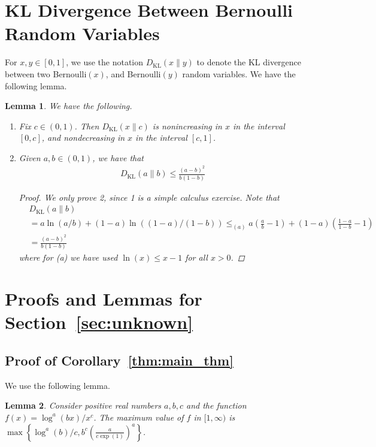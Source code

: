 \documentclass[12pt,draftcls, onecolumn]{IEEEtran}
\newtheorem{lemma}{Lemma}
\begin{document}
\section{KL Divergence Between Bernoulli Random Variables}
For $x,y \in [0,1]$, we use the notation $D_{\text{KL}}(x\lVert y)$ to denote the KL divergence between two Bernoulli$(x)$, and Bernoulli$(y)$ random variables. We have the following lemma.
\begin{lemma}\label{lemma:bern_KL}
     We have the following.
     \begin{enumerate}
         \item Fix $c \in (0,1)$. Then $D_{\text{KL}}(x\lVert c)$ is nonincreasing in $x$ in the interval $[0,c]$, and nondecreasing in $x$ in the interval $[c,1]$.
         \item Given $a,b \in (0,1)$, we have that
        \begin{align}
            D_{\text{KL}}(a\lVert b) \leq \frac{(a-b)^2}{b(1-b)} \nonumber
        \end{align}
        \begin{proof}
            We only prove 2, since 1 is a simple calculus exercise. Note that
            \begin{align}
                &D_{\text{KL}}(a\lVert b)\nonumber\\ &= a\ln(a/b) + (1-a)\ln((1-a)/(1-b)) \leq_{(a)} a\left(\frac{a}{b}-1\right)+(1-a)\left(\frac{1-a}{1-b}-1\right) \nonumber\\&=\frac{(a-b)^2}{b(1-b)}  \nonumber
            \end{align}
            where for (a) we have used $\ln(x) \leq x - 1$ for all $x>0$.
        \end{proof}
     \end{enumerate}
\end{lemma}
\section{Proofs and Lemmas for Section~\ref{sec:unknown}}
\subsection{Proof of Corollary~\ref{thm:main_thm}}\label{app:main_thm}
We use the following lemma.
\begin{lemma}\label{lemma:max_expabc}
    Consider positive real numbers $a,b,c$ and the function $f(x) = \log^a(bx)/x^c$. The maximum value of $f$ in $[1,\infty)$ is $\max\left\{\log^a(b)/c,b^c \left(\frac{a}{c\exp(1)}\right)^a\right\}$. 
\end{lemma}
\end{document}
